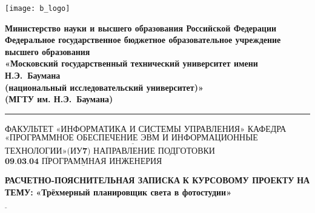\documentclass[12pt,a4paper,oneside]{report}
\begin{document}
	\thispagestyle{empty}
	\noindent \begin{minipage}{0.15\textwidth}
		\texttt{[image: b\_logo]}
	\end{minipage}
	\noindent\begin{minipage}{0.9\textwidth}\centering
		\textbf{Министерство науки и высшего образования Российской Федерации}\\
		\textbf{Федеральное государственное бюджетное образовательное учреждение высшего образования}\\
		\textbf{«Московский государственный технический университет имени Н.Э.~Баумана}\\
		\textbf{(национальный исследовательский университет)»}\\
		\textbf{(МГТУ им. Н.Э.~Баумана)}
	\end{minipage}
	\noindent\rule{18cm}{3pt}
	\newline\newline
	\noindent ФАКУЛЬТЕТ $\underline{\textbf{«ИНФОРМАТИКА И СИСТЕМЫ УПРАВЛЕНИЯ»}}$ \newline\newline
	\noindent КАФЕДРА $\underline{\textbf{«ПРОГРАММНОЕ ОБЕСПЕЧЕНИЕ ЭВМ И ИНФОРМАЦИОННЫЕ }}$\newline\newline
	$\underline{\textbf{ТЕХНОЛОГИИ»(ИУ7)}}$\newline\newline
	\noindent НАПРАВЛЕНИЕ ПОДГОТОВКИ $\underline{\textbf{09.03.04 ПРОГРАММНАЯ ИНЖЕНЕРИЯ}}$\newline\newline\newline\newline\newline\newline\newline
	\begin{center}
		\begin{flushright}
			\Large\textbf{РАСЧЕТНО-ПОЯСНИТЕЛЬНАЯ ЗАПИСКА}\newline
			\Large\textbf{К КУРСОВОМУ ПРОЕКТУ}\newline
			\Large\textbf{НА ТЕМУ:}\newline
			\Large\textbf{«Трёхмерный планировщик света в фотостудии»}\newline
		\end{flushright}
	\end{center}
	\noindent\textbf{} $\underline{\text{}}$\newline\newline\newline\newline
	
\end{document}
